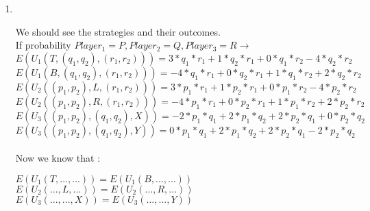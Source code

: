\begin{enumerate}
    \item \phantom{text}\\
    \begin{latin}
        We should see the strategies and their outcomes.\\
        If probability $Player_1 = P,Player_2 = Q, Player_3 = R \rightarrow$ \\ 
        $E(U_1(T,(q_1,q_2),(r_1,r_2))) = 3 * q_1 * r_1 + 1 * q_2 * r_1 + 0 * q_1 * r_2 - 4 * q_2 * r_2$\\
        $E(U_1(B,(q_1,q_2),(r_1,r_2))) = -4 * q_1 * r_1 + 0 * q_2 * r_1 + 1 * q_1 * r_2 + 2 * q_2 * r_2$\\
        $E(U_2((p_1,p_2),L,(r_1,r_2))) = 3 * p_1 * r_1 + 1 * p_2 * r_1 + 0 * p_1 * r_2 - 4 * p_2 * r_2$\\
        $E(U_2((p_1,p_2),R,(r_1,r_2))) = -4 * p_1 * r_1 + 0 * p_2 * r_1 + 1 * p_1 * r_2 + 2 * p_2 * r_2$\\
        $E(U_3((p_1,p_2),(q_1,q_2),X)) = -2 * p_1 * q_1 + 2 * p_1 * q_2 + 2 * p_2 * q_1 + 0 * p_2 * q_2$\\
        $E(U_3((p_1,p_2),(q_1,q_2),Y)) = 0 * p_1 * q_1 + 2 * p_1 * q_2 + 2 * p_2 * q_1  -2 * p_2 * q_2$\\ \\
        Now we know that : \begin{center}
            $E(U_1(T,...,...)) = E(U_1(B,...,...))$\\
            $E(U_2(...,L,...)) = E(U_2(...,R,...))$\\
            $E(U_3(...,...,X)) = E(U_3(...,...,Y))$\\


\end{center}
\end{latin}
\end{enumerate}
